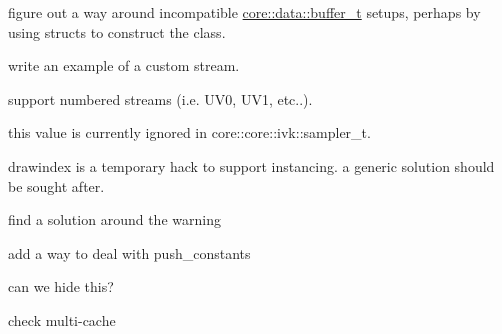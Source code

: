 
\begin{DoxyRefList}
\item[Class \mbox{\hyperlink{classcore_1_1data_1_1buffer__t}{core::data::buffer\+\_\+t}} ]\label{todo__todo000001}%
%
 figure out a way around incompatible \mbox{\hyperlink{classcore_1_1data_1_1buffer__t}{core\+::data\+::buffer\+\_\+t}} setups, perhaps by using structs to construct the class.  
\item[Class \mbox{\hyperlink{classcore_1_1data_1_1geometry__t}{core::data::geometry\+\_\+t}} ]\label{todo__todo000003}%
%
write an example of a custom stream. 

support numbered streams (i.\+e. U\+V0, U\+V1, etc..).  
\item[Member \mbox{\hyperlink{classcore_1_1data_1_1sampler__t_ace67337e9b24c8dd56a522d32f77ca70}{core::data::sampler\+\_\+t::mip\+\_\+maxlod}} () const]\label{todo__todo000004}%
%
this value is currently ignored in core\+::core\+::ivk\+::sampler\+\_\+t.  
\item[Member \mbox{\hyperlink{classcore_1_1ivk_1_1material__t_a0f05c71f5b90524760861509d3e8b7a1}{core::ivk::material\+\_\+t::bind\+\_\+pipeline}} (vk\+::\+Command\+Buffer cmd\+Buffer, core\+::resource\+::handle$<$ core\+::ivk\+::framebuffer\+\_\+t $>$ framebuffer, uint32\+\_\+t draw\+Index)]\label{todo__todo000008}%
%
drawindex is a temporary hack to support instancing. a generic solution should be sought after.  
\item[Class \mbox{\hyperlink{classcore_1_1ivk_1_1pipeline}{core::ivk::pipeline}} ]\label{todo__todo000009}%
%
find a solution around the warning  
\item[Class \mbox{\hyperlink{classcore_1_1meta_1_1shader}{core::meta::shader}} ]\label{todo__todo000005}%
%
add a way to deal with push\+\_\+constants  
\item[Member \mbox{\hyperlink{classcore_1_1os_1_1surface_aa7b3ec29b0e211088c166922398989c7}{core::os::surface::register\+\_\+swapchain}} (core\+::resource\+::handle$<$ core\+::ivk\+::swapchain $>$ swapchain)]\label{todo__todo000006}%
%
can we hide this?  
\item[Class \mbox{\hyperlink{structcore_1_1resource_1_1metadata}{core::resource::metadata}} ]\label{todo__todo000007}%
%
check multi-\/cache  
\item[Class \mbox{\hyperlink{classpsl_1_1serialization_1_1details_1_1anonymous__property}{psl::serialization::details::anonymous\+\_\+property$<$ T $>$}} ]\label{todo__todo000017}%

\end{DoxyRefList}
